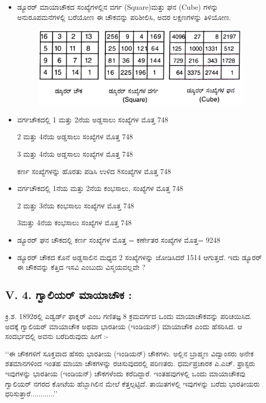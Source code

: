 \begin{itemize}
	\item ಡ್ಯೂರರ್ ಮಾಯಾಚೌಕದ ಸಂಖ್ಯೆಗಳಲ್ಲಿನ ವರ್ಗ (Square)ಮತ್ತು ಘನ (Cube) ಗಳನ್ನು ಅನುರೂಪಮನೆಗಳಲ್ಲಿ ಬರೆಯೋಣ
	ಈ ಚೌಕವನ್ನು ಪರಿಶೀಲಿಸಿ, ಅದರ ಲಕ್ಷಣಗಳನ್ನು ತಿಳಿಯೋಣ.
	\begin{figure}[h]
	\includegraphics{src/figures/chap4/fig4.20.jpg}
	\end{figure}

	\item ವರ್ಗಚೌಕದಲ್ಲಿ 1 ಮತ್ತು 2ನೆಯ ಅಡ್ಡಸಾಲು ಸಂಖ್ಯೆಗಳ ಮೊತ್ತ 748

	2 ಮತ್ತು 4ನೆಯ ಅಡ್ಡಸಾಲು ಸಂಖ್ಯೆಗಳ ಮೊತ್ತ 748

	3 ಮತ್ತು 4ನೆಯ ಅಡ್ಡಸಾಲು ಸಂಖ್ಯೆಗಳ ಮೊತ್ತ 748

	ಕರ್ಣ ಸಂಖ್ಯೆಗಳನ್ನು ಹೊರತು ಪಡಿಸಿ ಉಳಿದ 8ಸಂಖ್ಯೆಗಳ ಮೊತ್ತ 748
	\item ವರ್ಗಚೌಕದಲ್ಲಿ 1ನೆಯ ಮತ್ತು 2ನೆಯ ಕಂಭಸಾಲು, ಸಂಖ್ಯೆಗಳ ಮೊತ್ತ 748

	2 ಮತ್ತು 3ನೆಯ ಕಂಭಸಾಲು ಸಂಖ್ಯೆಗಳ ಮೊತ್ತ 748

	3ಮತ್ತು 4ನೆಯ ಕಂಭಸಾಲು ಸಂಖ್ಯೆಗಳ ಮೊತ್ತ 748
	\item ಡ್ಯೂರರ್ ಘನ ಚೌಕದಲ್ಲಿ ಕರ್ಣ ಸಂಖ್ಯೆಗಳ ಮೊತ್ತ = ಕರ್ಣೇತರ ಸಂಖ್ಯೆಗಳ ಮೊತ್ತ= 9248

	\item ಡ್ಯೂರರ್ ಚೌಕದ ಕೊನೆ ಅಡ್ಡಸಾಲಿನ ಮಧ್ಯದ 2 ಸಂಖ್ಯೆಗಳನ್ನು ಜೋಡಿಸಿದರೆ 1514 ಆಗುತ್ತದೆ. ಇದು ಡ್ಯೂರರ್ ಈ ಚೌಕವನ್ನು ಕೆತ್ತಿದ ಇಸವಿ ಎಂಬುದು ವಿಸ್ಮಯವಲ್ಲವೇ ?
\end{itemize}

\subsection*{V. 4. ಗ್ವಾಲಿಯರ್ ಮಾಯಾಚೌಕ :}

ಕ್ರಿ.ಶ. 1892ರಲ್ಲಿ ಎಡ್ವರ್ಡ್ ಫಾಕ್ನರ್ ಎಂಬ ಗಣಿತಜ್ಞ 8 ಕ್ರಮವರ್ಗದ ಒಂದು ಮಾಯಾಚೌಕವನ್ನು ಪರಿಚಯಿಸಿದ. ಅದಕ್ಕೆ ಗ್ವಾಲಿಯರ್ ಮಾಯಾಚೌಕ ಅಥವಾ ಭಾರತೀಯ (ಇಂಡಿಯನ್) ಮಾಯಾಚೌಕ ಎಂದು ಹೆಸರಿಸಿದ. ಆ ಸಂದರ್ಭದಲ್ಲಿ ಅವನು ಬರೆದಿರುವುದು ಹೀಗೆ :-

‘‘ಈ ಚೌಕಗಳಿಗೆ ಸೂಕ್ತವಾದ ಹೆಸರು ಭಾರತೀಯ (ಇಂಡಿಯನ್) ಚೌಕಗಳು. ಅಲ್ಲಿನ ಬ್ರಾಹ್ಮಣ ವಿದ್ವಾಂಸರು ಅನೇಕ ಶತಮಾನಗಳಿಂದ ಇಂತಹ ಮಾಯಾ ಚೌಕಗಳನ್ನು ರಚಿಸುವುದರಲ್ಲಿ ಪರಿಣತರು. ಧರ್ಮಪ್ರಚಾರಕ ಎ.ಎಚ್. ಫ್ರಾಸ್ಟರು ಇವುಗಳನ್ನು ಭಾರತೀಯ (ಇಂಡಿಯನ್) ಚೌಕಗಳೆಂದು ಕರೆದಿದ್ದಾರೆ. ಇಂತಹವುಗಳಲ್ಲಿ ಒಂದು ಮಾಯಾಚೌಕವು ಗ್ವಾಲಿಯರ್ ನಗರದ ಕೋಟೆಯ ಹೆಬ್ಬಾಗಿಲಿನ ಮೇಲೆ ಕೆತ್ತಲ್ಪಟ್ಟಿದೆ. ತಾಯಿತಗಳಲ್ಲಿ ಇವುಗಳನ್ನು ಬರೆದು ಭಾರತೀಯರು ಧರಿಸುತ್ತಾರೆ............’’

